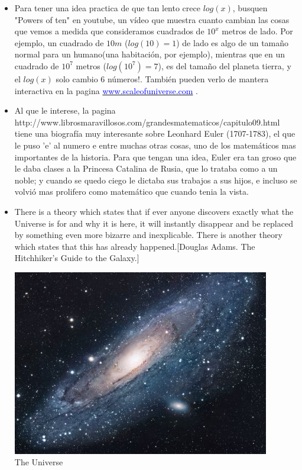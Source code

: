 \documentclass[a4paper,11pt,spanish,sans]{exam}
\begin{document}
\begin{itemize}
\item Para tener una idea practica de que tan lento crece $log(x)$, busquen "Powers of ten" en youtube, un vídeo que muestra cuanto cambian las cosas que vemos a medida que consideramos cuadrados de $10^x $ metros de lado. Por ejemplo, un cuadrado de $10m$ ($log(10)=1$) de lado es algo de un tamaño normal para  un humano(una habitación, por ejemplo), mientras que en un cuadrado de $10^7$ metros ($log(10^7)=7$), es del tamaño del planeta tierra, y el $log(x)$ solo cambio 6 números!.
También pueden verlo de mantera interactiva en la pagina \href{www.scaleofuniverse.com}{\textcolor{blue}{www.scaleofuniverse.com}}  .

\item Al que le interese, la pagina http://www.librosmaravillosos.com/grandesmatematicos/capitulo09.html tiene una biografía muy interesante sobre  Leonhard Euler (1707-1783), el que le puso 'e' al numero e entre muchas otras cosas, uno de los matemáticos mas importantes de la historia. Para que tengan una idea,  Euler era tan groso que le daba clases a la Princesa Catalina de Rusia, que lo trataba como a un noble; y cuando se quedo ciego le dictaba sus trabajos a sus hijos, e incluso se volvió mas prolifero como matemático que cuando tenia la vista. 

\item There is a theory which states that if ever anyone discovers exactly what the Universe is for and why it is here, it will instantly disappear and be replaced by something even more bizarre and inexplicable.
There is another theory which states that this has already happened.[Douglas Adams. The Hitchhiker's Guide to the Galaxy.]%

\centering
\includegraphics[scale=1.3]{universe.jpg}\\
\caption{The Universe}
\label{fig:univerise}


\end{itemize}
\end{document}
